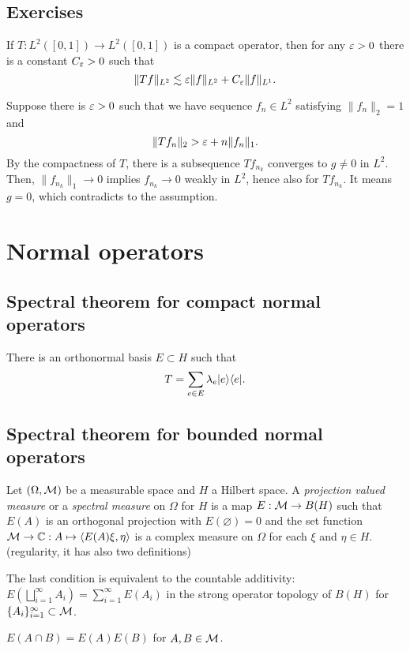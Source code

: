 \documentclass{../note}
\begin{document}
\section*{Exercises}
\begin{prb}
If $T:L^2([0,1])\to L^2([0,1])$ is a compact operator, then for any $\varepsilon>0$ there is a constant $C_\varepsilon>0$ such that
\[\|Tf\|_{L^2}\lesssim\varepsilon\|f\|_{L^2}+C_\varepsilon\|f\|_{L^1}.\]
\end{prb}
\begin{pf}
Suppose there is $\varepsilon>0$ such that we have sequence $f_n\in L^2$ satisfying $\|f_n\|_2=1$ and
\[\|Tf_n\|_2>\varepsilon+n\|f_n\|_1.\]
By the compactness of $T$, there is a subsequence $Tf_{n_k}$ converges to $g\ne0$ in $L^2$.
Then, $\|f_{n_k}\|_1\to0$ implies $f_{n_k}\to0$ weakly in $L^2$, hence also for $Tf_{n_k}$.
It means $g=0$, which contradicts to the assumption.
\end{pf}











\chapter{Normal operators}
\section{Spectral theorem for compact normal operators}
There is an orthonormal basis $E\subset H$ such that
\[T=\sum_{e\in E}\lambda_e|e\rangle\langle e|.\]

\section{Spectral theorem for bounded normal operators}

\begin{prb}
Let $(\Omega,\mathcal{M})$ be a measurable space and $H$ a Hilbert space.
A \emph{projection valued measure} or a \emph{spectral measure} on $\Omega$ for $H$ is a map $E:\mathcal{M}\to B(H)$ such that $E(A)$ is an orthogonal projection with $E(\varnothing)=0$ and the set function $\mathcal{M}\to\mathbb{C}:A\mapsto\langle E(A)\xi,\eta\rangle$ is a complex measure on $\Omega$ for each $\xi$ and $\eta\in H$.
(regularity, it has also two definitions)
\begin{parts}
\item The last condition is equivalent to the countable additivity: $E(\bigsqcup_{i=1}^\infty A_i)=\sum_{i=1}^\infty E(A_i)$ in the strong operator topology of $B(H)$ for $\{A_i\}_{i=1}^\infty\subset\mathcal{M}$.
\item $E(A\cap B)=E(A)E(B)$ for $A,B\in\mathcal{M}$.
\end{parts}
\end{prb}
\end{document}
